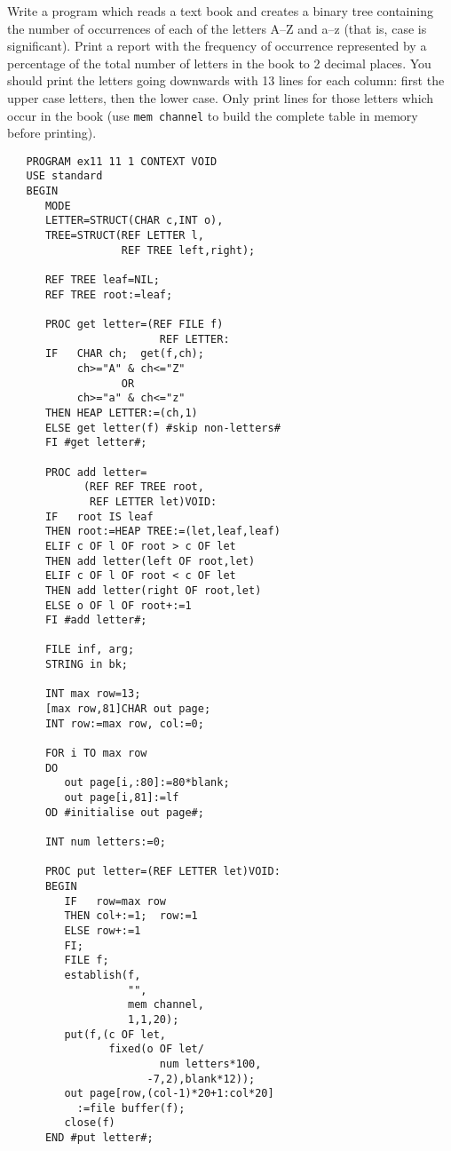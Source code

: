 \begin{exercise}
\item Write a program which reads a text book and creates a binary tree
containing the number of occurrences of each of the letters A--Z and
a--z (that is, case is significant). Print a report with the frequency
of occurrence represented by a percentage of the total number of
letters in the book to 2 decimal places. You should print the letters
going downwards with 13 lines for each column: first the upper case
letters, then the lower case. Only print lines for those letters which
occur in the book (use \verb|mem channel| to build the complete table in
memory before printing).\ans \ \newline%
\begin{verbatim}
   PROGRAM ex11 11 1 CONTEXT VOID
   USE standard
   BEGIN
      MODE
      LETTER=STRUCT(CHAR c,INT o),
      TREE=STRUCT(REF LETTER l,
                  REF TREE left,right);

      REF TREE leaf=NIL;
      REF TREE root:=leaf;

      PROC get letter=(REF FILE f)
                        REF LETTER:
      IF   CHAR ch;  get(f,ch);
           ch>="A" & ch<="Z"
                  OR
           ch>="a" & ch<="z"
      THEN HEAP LETTER:=(ch,1)
      ELSE get letter(f) #skip non-letters#
      FI #get letter#;

      PROC add letter=
            (REF REF TREE root,
             REF LETTER let)VOID:
      IF   root IS leaf
      THEN root:=HEAP TREE:=(let,leaf,leaf)
      ELIF c OF l OF root > c OF let
      THEN add letter(left OF root,let)
      ELIF c OF l OF root < c OF let
      THEN add letter(right OF root,let)
      ELSE o OF l OF root+:=1
      FI #add letter#;

      FILE inf, arg;
      STRING in bk;

      INT max row=13;
      [max row,81]CHAR out page;
      INT row:=max row, col:=0;

      FOR i TO max row
      DO
         out page[i,:80]:=80*blank;
         out page[i,81]:=lf
      OD #initialise out page#;

      INT num letters:=0;

      PROC put letter=(REF LETTER let)VOID:
      BEGIN
         IF   row=max row
         THEN col+:=1;  row:=1
         ELSE row+:=1
         FI;
         FILE f;
         establish(f,
                   "",
                   mem channel,
                   1,1,20);
         put(f,(c OF let,
                fixed(o OF let/
                        num letters*100,
                      -7,2),blank*12));
         out page[row,(col-1)*20+1:col*20]
           :=file buffer(f);
         close(f)
      END #put letter#;


\end{verbatim}
\end{exercise}
